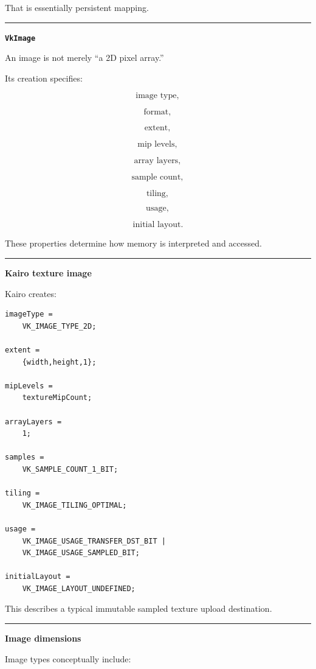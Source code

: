 That is essentially persistent mapping.

\begin{center}\rule{0.5\linewidth}{0.5pt}\end{center}

\textbf{\texttt{VkImage}}

An image is not merely ``a 2D pixel array.''

Its creation specifies:

\[
\text{image type},
\]

\[
\text{format},
\]

\[
\text{extent},
\]

\[
\text{mip levels},
\]

\[
\text{array layers},
\]

\[
\text{sample count},
\]

\[
\text{tiling},
\]

\[
\text{usage},
\]

\[
\text{initial layout}.
\]

These properties determine how memory is interpreted and accessed.

\begin{center}\rule{0.5\linewidth}{0.5pt}\end{center}

\textbf{Kairo texture image}

Kairo creates:

\begin{verbatim}
imageType =
    VK_IMAGE_TYPE_2D;

extent =
    {width,height,1};

mipLevels =
    textureMipCount;

arrayLayers =
    1;

samples =
    VK_SAMPLE_COUNT_1_BIT;

tiling =
    VK_IMAGE_TILING_OPTIMAL;

usage =
    VK_IMAGE_USAGE_TRANSFER_DST_BIT |
    VK_IMAGE_USAGE_SAMPLED_BIT;

initialLayout =
    VK_IMAGE_LAYOUT_UNDEFINED;
\end{verbatim}

This describes a typical immutable sampled texture upload destination.

\begin{center}\rule{0.5\linewidth}{0.5pt}\end{center}

\textbf{Image dimensions}

Image types conceptually include:

